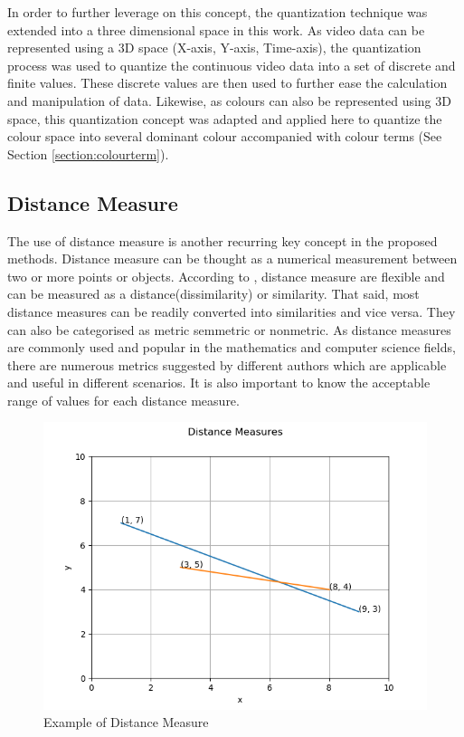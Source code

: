 In order to further leverage on this concept, the quantization technique
was extended into a three dimensional space in this work. As video data can be
represented using a 3D space (X-axis, Y-axis, Time-axis), the quantization
process was used to quantize the continuous video data into a set of discrete
and finite values. These discrete values are then used to further ease the
calculation and manipulation of data. Likewise, as colours can also be
represented using 3D space, this quantization concept was adapted and applied
here to quantize the colour space into several dominant colour accompanied
with colour terms (See Section \ref{section:colourterm}).



\subsection{Distance Measure}
\label{section:distancemeasures}

The use of distance measure is another recurring key concept in the proposed
methods. Distance measure can be thought as a numerical measurement between
two or more points or objects. According to \cite{mccune2002distance},
distance measure are flexible and can be measured as a distance(dissimilarity)
or similarity. That said, most distance measures can be readily converted into
similarities and vice versa. They can also be categorised as metric
semmetric or nonmetric.
As distance measures are commonly used and popular in the mathematics and
computer science fields, there are numerous metrics suggested by different
authors which are applicable and useful in different scenarios. It is also
important to know the acceptable range of values for each distance measure.

\begin{figure}[hbt!]
 \centering
 \includegraphics[width=.7\textwidth]{image/general/distance.png}
 \caption{Example of Distance Measure}
 \label{fig:distanceMeasure}
\end{figure}

